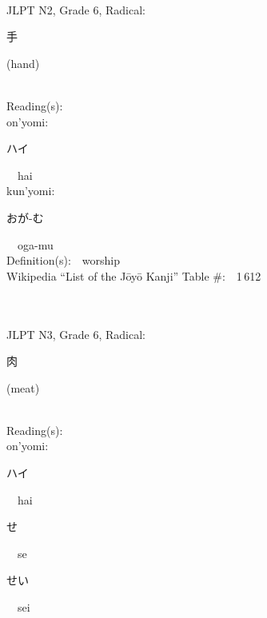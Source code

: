 \begin{multicols}{2}
{\fontsize{34pt}{40pt}  }\ \ \\  %
{JLPT N2, Grade 6, Radical:\ \ {\begin{CJK}{UTF8}{min} 手 \end{CJK}} (hand) } \\
Reading(s):\ \ \\
{\hspace*{1em}}on'yomi:\ \ \\
{\hspace*{2em}}{\begin{CJK}{UTF8}{min} ハイ \end{CJK}}\ \ hai\ \ \\
{\hspace*{1em}}kun'yomi:\ \ \\
{\hspace*{2em}}{\begin{CJK}{UTF8}{min} おが-む \end{CJK}}\ \ oga-mu\ \ \\
Definition(s):\ \ worship \\
Wikipedia ``List of the J\=oy\=o Kanji'' Table \#:\ \ 1\,612 \\
\ \ \\
{\fontsize{34pt}{40pt}  }\ \ \\  %
{JLPT N3, Grade 6, Radical:\ \ {\begin{CJK}{UTF8}{min} 肉 \end{CJK}} (meat) } \\
Reading(s):\ \ \\
{\hspace*{1em}}on'yomi:\ \ \\
{\hspace*{2em}}{\begin{CJK}{UTF8}{min} ハイ \end{CJK}}\ \ hai\ \ \\
{\hspace*{2em}}{\begin{CJK}{UTF8}{min} せ \end{CJK}}\ \ se\ \ \\
{\hspace*{2em}}{\begin{CJK}{UTF8}{min} せい \end{CJK}}\ \ sei\ \ \\

\end{multicols}
